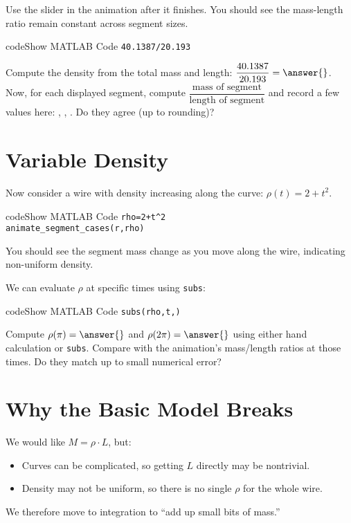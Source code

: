 \documentclass{ximera}
\begin{document}
Use the slider in the animation after it finishes. You should see the mass-length ratio remain constant across segment sizes.

\begin{expandable}{code}{Show MATLAB Code}
\texttt{40.1387/20.193}
\end{expandable}

\begin{problem}
Compute the density from the total mass and length: $\dfrac{40.1387}{20.193} = \answer{}$.  
Now, for each displayed segment, compute $\dfrac{\text{mass of segment}}{\text{length of segment}}$ and record a few values here: , , . Do they agree (up to rounding)?
\end{problem}

\section*{Variable Density}

Now consider a wire with density increasing along the curve: $\rho(t)=2+t^2$.

\begin{expandable}{code}{Show MATLAB Code}
\texttt{rho=2+t\^{}2}\\
\texttt{animate\_segment\_cases(r,\;rho)}
\end{expandable}

You should see the segment mass change as you move along the wire, indicating non-uniform density.

We can evaluate $\rho$ at specific times using \texttt{subs}:

\begin{expandable}{code}{Show MATLAB Code}
\texttt{subs(rho,\;t,)}
\end{expandable}

\begin{problem}
Compute $\rho(\pi)=\answer{}$ and $\rho(2\pi)=\answer{}$ using either hand calculation or \texttt{subs}. Compare with the animation's mass/length ratios at those times. Do they match up to small numerical error?
\end{problem}

\section*{Why the Basic Model Breaks}

We would like $M=\rho\cdot L$, but:
\begin{itemize}
\item Curves can be complicated, so getting $L$ directly may be nontrivial.
\item Density may not be uniform, so there is no single $\rho$ for the whole wire.
\end{itemize}
We therefore move to integration to ``add up small bits of mass.''
\end{document}
